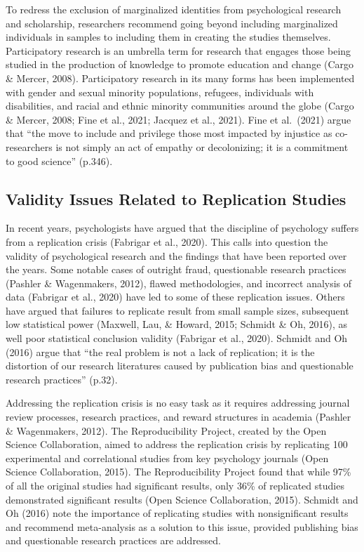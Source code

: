 \documentclass[
  11pt,
]{book}
\begin{document}
To redress the exclusion of marginalized identities from psychological research and scholarship, researchers recommend going beyond including marginalized individuals in samples to including them in creating the studies themselves. Participatory research is an umbrella term for research that engages those being studied in the production of knowledge to promote education and change (Cargo \& Mercer, 2008). Participatory research in its many forms has been implemented with gender and sexual minority populations, refugees, individuals with disabilities, and racial and ethnic minority communities around the globe (Cargo \& Mercer, 2008; Fine et al., 2021; Jacquez et al., 2021). Fine et al.~(2021) argue that ``the move to include and privilege those most impacted by injustice as co-researchers is not simply an act of empathy or decolonizing; it is a commitment to good science'' (p.346).

\hypertarget{validity-issues-related-to-replication-studies}{%
\subsection{Validity Issues Related to Replication Studies}\label{validity-issues-related-to-replication-studies}}

In recent years, psychologists have argued that the discipline of psychology suffers from a replication crisis (Fabrigar et al., 2020). This calls into question the validity of psychological research and the findings that have been reported over the years. Some notable cases of outright fraud, questionable research practices (Pashler \& Wagenmakers, 2012), flawed methodologies, and incorrect analysis of data (Fabrigar et al., 2020) have led to some of these replication issues. Others have argued that failures to replicate result from small sample sizes, subsequent low statistical power (Maxwell, Lau, \& Howard, 2015; Schmidt \& Oh, 2016), as well poor statistical conclusion validity (Fabrigar et al., 2020). Schmidt and Oh (2016) argue that ``the real problem is not a lack of replication; it is the distortion of our research literatures caused by publication bias and questionable research practices'' (p.32).

Addressing the replication crisis is no easy task as it requires addressing journal review processes, research practices, and reward structures in academia (Pashler \& Wagenmakers, 2012). The Reproducibility Project, created by the Open Science Collaboration, aimed to address the replication crisis by replicating 100 experimental and correlational studies from key psychology journals (Open Science Collaboration, 2015). The Reproducibility Project found that while 97\% of all the original studies had significant results, only 36\% of replicated studies demonstrated significant results (Open Science Collaboration, 2015). Schmidt and Oh (2016) note the importance of replicating studies with nonsignificant results and recommend meta-analysis as a solution to this issue, provided publishing bias and questionable research practices are addressed.
\end{document}
